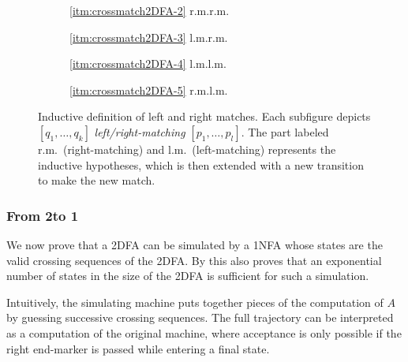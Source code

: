 \begin{figure}
	\centering
	\begin{subfigure}{0.246\textwidth}
		\centering
		
		\caption*{\ref{itm:crossmatch2DFA-2} r.m.\tto r.m.}
	\end{subfigure}
	\hfill
	\begin{subfigure}{0.242\textwidth}
		\centering
		
		\caption*{\ref{itm:crossmatch2DFA-3} l.m.\tto r.m.}
	\end{subfigure}
	\hfill
	\begin{subfigure}{0.242\textwidth}
		\centering
		
		\caption*{\ref{itm:crossmatch2DFA-4} l.m.\tto l.m.}
	\end{subfigure}
	\hfill
	\begin{subfigure}{0.246\textwidth}
		\centering
		
		\caption*{\ref{itm:crossmatch2DFA-5} r.m.\tto l.m.}
	\end{subfigure}
	\caption{Inductive definition of left and right matches. Each subfigure depicts $[q_1,\dots,q_k]$ \emph{left/right-matching} $[p_1,\dots,p_l]$. The part labeled r.m.\ (right-matching) and l.m.\ (left-matching) represents the inductive hypotheses, which is then extended with a new transition to make the new match.}
	\label{fig:2DFA-crossmatch}
\end{figure}

\subsubsection{From 2\DFAs to 1\NFAs}
We now prove that a 2DFA can be simulated by a 1NFA whose states are the valid crossing sequences of the 2DFA.
By  this also proves that an exponential number of states in the size of the 2DFA is sufficient for such a simulation.

Intuitively, the simulating machine puts together pieces of the computation of $A$ by guessing successive crossing sequences.
The full trajectory can be interpreted as a computation of the original machine, where acceptance is only possible if the right end-marker is passed while entering a final state.

